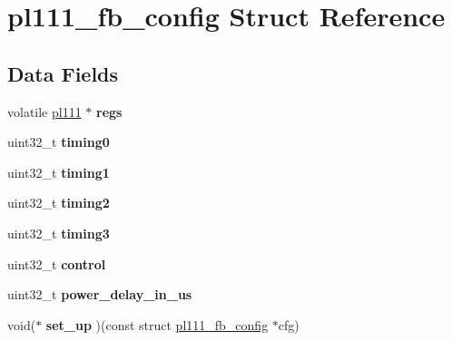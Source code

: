 \hypertarget{structpl111__fb__config}{}\section{pl111\+\_\+fb\+\_\+config Struct Reference}
\label{structpl111__fb__config}
\subsection*{Data Fields}
\begin{DoxyCompactItemize}
\item 
\mbox{\label{structpl111__fb__config_af37d9dd16e9f2697d2f9707139df303a}} 
volatile \mbox{\hyperlink{structpl111}{pl111}} $\ast$ {\bfseries regs}
\item 
\mbox{\label{structpl111__fb__config_a85973c364fe8757b1e8153094b22d08d}} 
uint32\+\_\+t {\bfseries timing0}
\item 
\mbox{\label{structpl111__fb__config_a3fae6822b5d63d8e54c476b84aedab55}} 
uint32\+\_\+t {\bfseries timing1}
\item 
\mbox{\label{structpl111__fb__config_a966f9be2fa0984cb12b7ed4dc0ab9a46}} 
uint32\+\_\+t {\bfseries timing2}
\item 
\mbox{\label{structpl111__fb__config_a0496782edd6d8b076b357fcd5194a2a0}} 
uint32\+\_\+t {\bfseries timing3}
\item 
\mbox{\label{structpl111__fb__config_a8dca7cd4643808ac4c2e95367c49c9e1}} 
uint32\+\_\+t {\bfseries control}
\item 
\mbox{\label{structpl111__fb__config_ab58e58fab296e7ee21bb8eba333fd99a}} 
uint32\+\_\+t {\bfseries power\+\_\+delay\+\_\+in\+\_\+us}
\item 
\mbox{\label{structpl111__fb__config_a2922f65e858d69fa4a9bd14fbe284428}} 
void($\ast$ {\bfseries set\+\_\+up} )(const struct \mbox{\hyperlink{structpl111__fb__config}{pl111\+\_\+fb\+\_\+config}} $\ast$cfg)
\item 
\mbox{\label{structpl111__fb__config_a848d2c82e618dbfca3b083908a6ca1df}} 

\end{DoxyCompactItemize}
